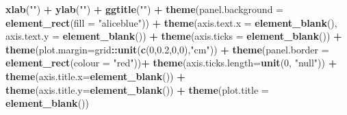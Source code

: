 \documentclass[12pt,twoside]{reedthesis}
\newenvironment{Shaded}{\begin{snugshade}}{\end{snugshade}}
\newcommand{\DataTypeTok}[1]{\textcolor[rgb]{0.13,0.29,0.53}{#1}}
\newcommand{\DecValTok}[1]{\textcolor[rgb]{0.00,0.00,0.81}{#1}}
\newcommand{\FloatTok}[1]{\textcolor[rgb]{0.00,0.00,0.81}{#1}}
\newcommand{\KeywordTok}[1]{\textcolor[rgb]{0.13,0.29,0.53}{\textbf{#1}}}
\newcommand{\NormalTok}[1]{#1}
\newcommand{\OperatorTok}[1]{\textcolor[rgb]{0.81,0.36,0.00}{\textbf{#1}}}
\newcommand{\StringTok}[1]{\textcolor[rgb]{0.31,0.60,0.02}{#1}}
\begin{document}
\begin{Shaded}
\begin{Highlighting}[]
\StringTok{  }\KeywordTok{xlab}\NormalTok{(}\StringTok{""}\NormalTok{) }\OperatorTok{+}\StringTok{ }
\StringTok{  }\KeywordTok{ylab}\NormalTok{(}\StringTok{""}\NormalTok{) }\OperatorTok{+}\StringTok{ }
\StringTok{  }\KeywordTok{ggtitle}\NormalTok{(}\StringTok{""}\NormalTok{) }\OperatorTok{+}
\StringTok{  }\KeywordTok{theme}\NormalTok{(}\DataTypeTok{panel.background =} \KeywordTok{element_rect}\NormalTok{(}\DataTypeTok{fill =} \StringTok{"aliceblue"}\NormalTok{)) }\OperatorTok{+}
\StringTok{  }\KeywordTok{theme}\NormalTok{(}\DataTypeTok{axis.text.x =} \KeywordTok{element_blank}\NormalTok{(), }\DataTypeTok{axis.text.y =} \KeywordTok{element_blank}\NormalTok{()) }\OperatorTok{+}
\StringTok{  }\KeywordTok{theme}\NormalTok{(}\DataTypeTok{axis.ticks =} \KeywordTok{element_blank}\NormalTok{()) }\OperatorTok{+}
\StringTok{  }\KeywordTok{theme}\NormalTok{(}\DataTypeTok{plot.margin=}\NormalTok{grid}\OperatorTok{::}\KeywordTok{unit}\NormalTok{(}\KeywordTok{c}\NormalTok{(}\DecValTok{0}\NormalTok{,}\FloatTok{0.2}\NormalTok{,}\DecValTok{0}\NormalTok{,}\DecValTok{0}\NormalTok{),}\StringTok{"cm"}\NormalTok{)) }\OperatorTok{+}\StringTok{ }
\StringTok{  }\KeywordTok{theme}\NormalTok{(}\DataTypeTok{panel.border =} \KeywordTok{element_rect}\NormalTok{(}\DataTypeTok{colour =} \StringTok{"red"}\NormalTok{))}\OperatorTok{+}
\StringTok{  }\KeywordTok{theme}\NormalTok{(}\DataTypeTok{axis.ticks.length=}\KeywordTok{unit}\NormalTok{(}\DecValTok{0}\NormalTok{, }\StringTok{"null"}\NormalTok{)) }\OperatorTok{+}
\StringTok{  }\KeywordTok{theme}\NormalTok{(}\DataTypeTok{axis.title.x=}\KeywordTok{element_blank}\NormalTok{()) }\OperatorTok{+}
\StringTok{  }\KeywordTok{theme}\NormalTok{(}\DataTypeTok{axis.title.y=}\KeywordTok{element_blank}\NormalTok{()) }\OperatorTok{+}
\StringTok{  }\KeywordTok{theme}\NormalTok{(}\DataTypeTok{plot.title =} \KeywordTok{element_blank}\NormalTok{())}


\end{Highlighting}
\end{Shaded}
\end{document}
